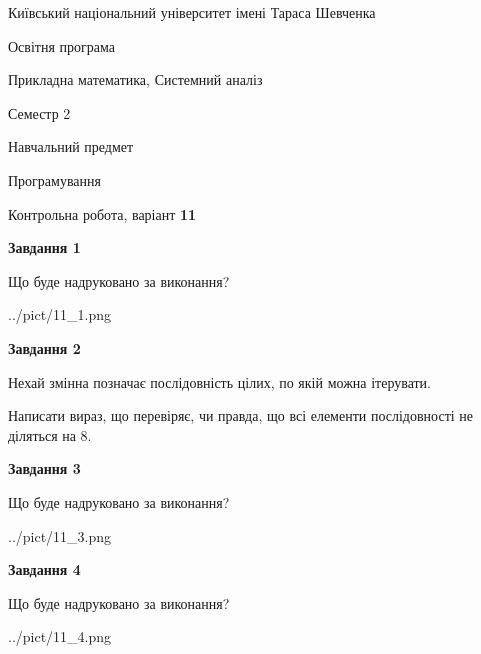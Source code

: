 \documentclass[12pt, ukrainian]{article}
\begin{document}
{{\begin {small}\par
{ \center  Київський національний університет імені Тараса Шевченка \par}
{\parbox {5 cm}{Освітня програма \hfill}{\parbox {8 cm}{Прикладна математика, Системний аналіз \hfill}}\parbox {5 cm}{\hfill Семестр 2}}\par
{\parbox {5 cm} {Навчальний предмет \hfill}\parbox {7 cm}{Програмування \hfill}\parbox {6cm}{\hfill}\par}\vspace{-7pt} \end{small}}{\center Контрольна робота, варіант  \No \textbf
{ 11 }\par}}
{
\begin {large}
{\begin {center}\textbf{Завдання 1}\end {center}}\par
Що буде надруковано за виконання?\par\par
\begin{center}
	{../pict/11_1.png}
\end{center}
\newpage

{\begin {center}\textbf{Завдання 2}\end {center}}\par
Нехай змінна  позначає послідовність цілих, по якій можна ітерувати.

Написати вираз, що перевіряє, чи правда, що всі елементи послідовності не діляться на 8.\par
\newpage

{\begin {center}\textbf{Завдання 3}\end {center}}\par
Що буде надруковано за виконання?\par
\begin{center}
	{../pict/11_3.png}
\end{center}
\newpage

{\begin {center}\textbf{Завдання 4}\end {center}}\par
Що буде надруковано за виконання?\par
\begin{center}
	{../pict/11_4.png}
\end{center}
\newpage


\end{large}}
\end{document}
